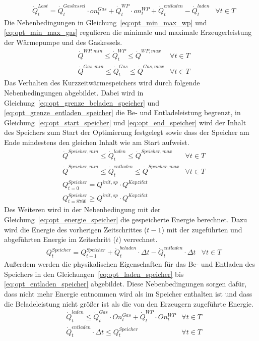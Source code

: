 \begin{align}
	&\dot{Q}^{Last}_{t} = \dot{Q}^{Gaskessel}_{t} \cdot on^{Gas}_{t} + \dot{Q}^{WP}_{t} \cdot on^{WP}_{t} + \dot{Q}^{entladen}_{t} - \dot{Q}^{laden}_{t}&\forall t \in T \label{eq:opt_energie_netz}
\end{align}
Die Nebenbedingungen in Gleichung~\ref{eq:opt_min_max_wp} und \ref{eq:opt_min_max_gas} regulieren die minimale und maximale Erzeugerleistung der Wärmepumpe und des Gaskessels.
\begin{align}
	&\dot{Q}^{WP,min} \leq \dot{Q}^{WP}_{t} \leq \dot{Q}^{WP,max}&\forall t \in T \label{eq:opt_min_max_wp}\\
	&\dot{Q}^{Gas,min} \leq \dot{Q}^{Gas}_{t} \leq \dot{Q}^{Gas,max}&\forall t \in T \label{eq:opt_min_max_gas}
\end{align}
Das Verhalten des Kurzzeitwärmespeichers wird durch folgende Nebenbedingungen abgebildet. Dabei wird in Gleichung~\ref{eq:opt_grenze_beladen_speicher} und \ref{eq:opt_grenze_entladen_speicher} die Be- und Entladeleistung begrenzt, in Gleichung~\ref{eq:opt_start_speicher} und \ref{eq:opt_end_speicher} wird der Inhalt des Speichers zum Start der Optimierung festgelegt sowie dass der Speicher am Ende mindestens den gleichen Inhalt wie am Start aufweist.
\begin{align}
	&\dot{Q}^{Speicher,min} \leq \dot{Q}^{laden}_{t} \leq \dot{Q}^{Speicher,max}&\forall t \in T \label{eq:opt_grenze_beladen_speicher}\\
	&\dot{Q}^{Speicher,min} \leq \dot{Q}^{entladen}_{t} \leq \dot{Q}^{Speicher,max} &\forall t \in T \label{eq:opt_grenze_entladen_speicher}\\
	&Q^{Speicher}_{t=0} = Q^{init, sp} \cdot Q^{Kapzit \ddot{a} t}& \label{eq:opt_start_speicher}\\
	&Q^{Speicher}_{t=8760} \geq Q^{init, sp} \cdot Q^{Kapzit \ddot{a} t} & \label{eq:opt_end_speicher}
\end{align}
Des Weiteren wird in der Nebenbedingung mit der Gleichung~\ref{eq:opt_energie_speicher} die gespeicherte Energie berechnet. Dazu wird die Energie des vorherigen Zeitschrittes ($t-1$) mit der zugeführten und abgeführten Energie im Zeitschritt ($t$) verrechnet.
\begin{align}	
	&Q^{Speicher}_{t}=Q^{Speicher}_{t-1} + \dot{Q}^{beladen}_{t} \cdot \Delta t - \dot{Q}^{entladen}_{t} \cdot \Delta t &\forall t \in T \label{eq:opt_energie_speicher}
\end{align}
Außerdem werden die physikalischen Eigenschaften für das Be- und Entladen des Speichers in den Gleichungen~\ref{eq:opt_laden_speicher} bis \ref{eq:opt_entladen_speicher} abgebildet. Diese Nebenbedingungen sorgen dafür, dass nicht mehr Energie entnommen wird als im Speicher enthalten ist und dass die Beladeleistung nicht größer ist als die von den Erzeugern zugeführte Energie.
\begin{align}
	&\dot{Q}^{laden}_{t} \leq \dot{Q}^{Gas}_{t} \cdot On^{Gas}_{t} + \dot{Q}^{WP}_{t} \cdot On^{WP}_{t} \label{eq:opt_laden_speicher}&\forall t \in T\\
	&\dot{Q}^{entladen}_{t} \cdot \Delta t \leq Q^{Speicher}_t &\forall t \in T \label{eq:opt_entladen_speicher}
\end{align}


